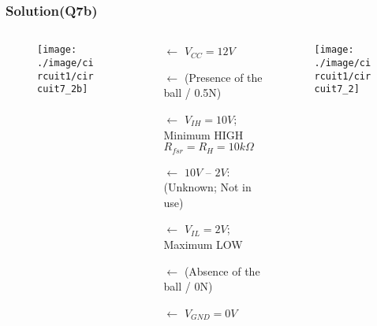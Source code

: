 \documentclass{beamer}
\begin{document}
\begin{frame}
\frametitle{Solution(Q7b)}
\begin{columns}

\begin{column}{2cm}
\begin{figure}[H]
  \centering
  \texttt{[image: ./image/circuit1/circuit7\_2b]}
\end{figure}
\end{column}

\begin{column}{7cm}
\vspace{10 mm}
\begin{itemize} \itemsep1pt \parskip0pt 
  \item[$\leftarrow$] $V_{CC} = 12V$ \vspace{2 mm}
  \item[$\leftarrow$](Presence of the ball / 0.5N)\vspace{2 mm}
  \item[$\leftarrow$] $V_{IH} = 10V$; Minimum HIGH \newline$R_{fsr} = R_H = 10k\Omega$ \vspace{4 mm}
  \item[$\leftarrow$] $10V$ -- $2V$: (Unknown; Not in use)\vspace{8 mm}
  \item[$\leftarrow$] $V_{IL} = 2V$; Maximum LOW\vspace{3 mm}
  \item[$\leftarrow$] (Absence of the ball / 0N)\vspace{3 mm}
  \item[$\leftarrow$] $V_{GND} = 0V$
\end{itemize}
\end{column}

\begin{column}{4cm}
\begin{figure}[H]
  \centering
  \texttt{[image: ./image/circuit1/circuit7\_2]}
\end{figure}
\vspace{20 mm}
\end{column}







\end{columns}

\end{frame}
\end{document}
